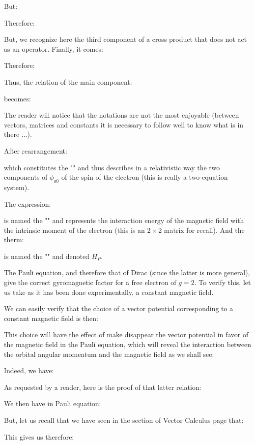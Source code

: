 	But:
	
	Therefore:
	 
	But, we recognize here the third component of a cross product that does not act as an operator. Finally, it comes:
	
	Therefore:
	
	Thus, the relation of the main component:
	
	becomes:
	
	The reader will notice that the notations are not the most enjoyable (between vectors, matrices and constants it is necessary to follow well to know what is in there ...).

	After rearrangement:
	
	which constitutes the "" and thus describes in a relativistic way the two components of $\phi_{a0}$ of the spin of the electron (this is really a two-equation system).

	The expression:
	
	is named the "" and represents the interaction energy of the magnetic field with the intrinsic moment of the electron (this is an $2\times 2$ matrix for recall). And the therm:
	
	is named the "" and denoted $H_P$.

	The Pauli equation, and therefore that of Dirac (since the latter is more general), give the correct gyromagnetic factor for a free electron of $g=2$. To verify this, let us take as it has been done experimentally, a constant magnetic field.

	We can easily verify that the choice of a vector potential corresponding to a constant magnetic field is then:
	
	This choice will have the effect of make disappear the vector potential in favor of the magnetic field in the Pauli equation, which will reveal the interaction between the orbital angular momentum and the magnetic field as we shall see:

	Indeed, we have:
	
	As requested by a reader, here is the proof of that latter relation:
	
	We then have in Pauli equation:
	
	But, let us recall that we have seen in the section of Vector Calculus page \pageref{cross product} that:
	
	This gives us therefore:
	
